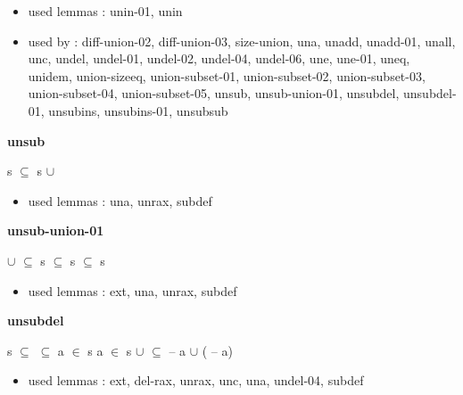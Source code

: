 \documentclass[a4paper]{article}
\begin{document}
\begin{itemize}


\item       used lemmas  : unin-01, unin
\item       used by      : diff-union-02, diff-union-03, size-union, una, unadd, unadd-01, unall, unc, undel, undel-01, undel-02, undel-04, undel-06, une, une-01, uneq, unidem, union-sizeeq, union-subset-01, union-subset-02, union-subset-03, union-subset-04, union-subset-05, unsub, unsub-union-01, unsubdel, unsubdel-01, unsubins, unsubins-01, unsubsub

\end{itemize}

\medskip

\bigskip

{\large\bf unsub}

\medskip

 \Fol s $\subseteq$ s $\cup$ 

\begin{itemize}


\item       used lemmas  : una, unrax, subdef

\end{itemize}

\medskip

\bigskip

{\large\bf unsub-union-01}

\medskip

 \Fol {} $\cup$  $\subseteq$ s \Equiv {} $\subseteq$ s \And {} $\subseteq$ s

\begin{itemize}


\item       used lemmas  : ext, una, unrax, subdef

\end{itemize}

\medskip

\bigskip

{\large\bf unsubdel}

\medskip

 \Fol s $\subseteq$  \And {} $\subseteq$  \And \Not a $\in$ s \And \Not a $\in$  \Imp s $\cup$  $\subseteq$  -- a $\cup$ ( -- a)

\begin{itemize}


\item       used lemmas  : ext, del-rax, unrax, unc, una, undel-04, subdef

\end{itemize}
\end{document}
